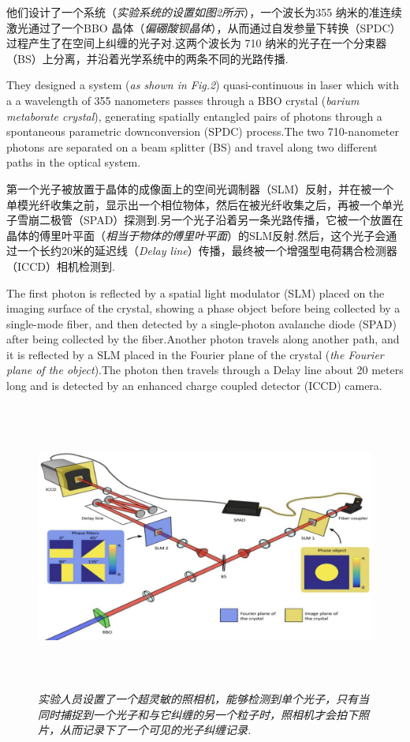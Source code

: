 \begin{multicols}{2}
他们设计了一个系统（\textit{实验系统的设置如图2所示}），一个波长为355 纳米的准连续激光通过了一个BBO 晶体（\textit{偏硼酸钡晶体}），从而通过自发参量下转换（SPDC）过程产生了在空间上纠缠的光子对.这两个波长为 710 纳米的光子在一个分束器（BS）上分离，并沿着光学系统中的两条不同的光路传播.

They designed a system (\textit{as shown in Fig.2}\/) quasi-continuous in laser which with a a wavelength of 355 nanometers passes through a BBO crystal (\textit{barium metaborate crystal}\/), generating spatially entangled pairs of photons through a spontaneous parametric downconversion (SPDC) process.The two 710-nanometer photons are separated on a beam splitter (BS) and travel along two different paths in the optical system. 

第一个光子被放置于晶体的成像面上的空间光调制器（SLM）反射，并在被一个单模光纤收集之前，显示出一个相位物体，然后在被光纤收集之后，再被一个单光子雪崩二极管（SPAD）探测到.另一个光子沿着另一条光路传播，它被一个放置在晶体的傅里叶平面（\textit{相当于物体的傅里叶平面}）的SLM反射.然后，这个光子会通过一个长约20米的延迟线（\textit{Delay line}\/）传播，最终被一个增强型电荷耦合检测器（ICCD）相机检测到.

The first photon is reflected by a spatial light modulator (SLM) placed on the imaging surface of the crystal, showing a phase object before being collected by a single-mode fiber, and then detected by a single-photon avalanche diode (SPAD) after being collected by the fiber.Another photon travels along another path, and it is reflected by a SLM placed in the Fourier plane of the crystal (\textit{the Fourier plane of the object}\/).The photon then travels through a Delay line about 20 meters long and is detected by an enhanced charge coupled detector (ICCD) camera. 

\end{multicols}

\begin{figure}[t]
    \centering
    \includegraphics[width=0.9\linewidth,height=9.5cm]{IMG/201907/02.jpg}
    \caption{\textit{实验人员设置了一个超灵敏的照相机，能够检测到单个光子，只有当同时捕捉到一个光子和与它纠缠的另一个粒子时，照相机才会拍下照片，从而记录下了一个可见的光子纠缠记录.}}
    
\end{figure}

